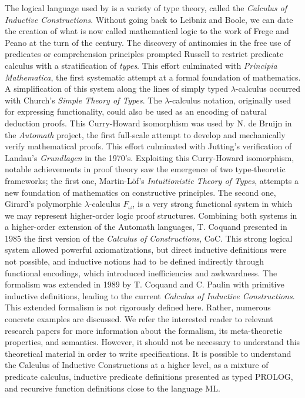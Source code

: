 The logical language used by {\Coq} is a variety of type theory,
called the \emph{Calculus of Inductive Constructions}. Without going
back to Leibniz and Boole, we can date the creation of what is now
called mathematical logic to the work of Frege and Peano at the turn
of the century. The discovery of antinomies in the free use of
predicates or comprehension principles prompted Russell to restrict
predicate calculus with a stratification of \emph{types}. This effort
culminated with \emph{Principia Mathematica}, the first systematic
attempt at a formal foundation of mathematics.  A simplification of
this system along the lines of simply typed $\lambda$-calculus
occurred with Church's \emph{Simple Theory of Types}.  The
$\lambda$-calculus notation, originally used for expressing
functionality, could also be used as an encoding of natural deduction
proofs. This Curry-Howard isomorphism was used by N. de Bruijn in the
\emph{Automath} project, the first full-scale attempt to develop and
mechanically verify mathematical proofs. This effort culminated with
Jutting's verification of Landau's \emph{Grundlagen} in the 1970's.
Exploiting this Curry-Howard isomorphism, notable achievements in
proof theory saw the emergence of two type-theoretic frameworks; the
first one, Martin-L\"of's \emph{Intuitionistic Theory of Types},
attempts a new foundation of mathematics on constructive principles.
The second one, Girard's polymorphic $\lambda$-calculus $F_\omega$, is
a very strong functional system in which we may represent higher-order
logic proof structures.  Combining both systems in a higher-order
extension of the Automath languages, T. Coquand presented in 1985 the
first version of the \emph{Calculus of Constructions}, CoC. This strong
logical system allowed powerful axiomatizations, but direct inductive
definitions were not possible, and inductive notions had to be defined
indirectly through functional encodings, which introduced
inefficiencies and awkwardness. The formalism was extended in 1989 by
T. Coquand and C. Paulin with primitive inductive definitions, leading
to the current \emph{Calculus of Inductive Constructions}.  This
extended formalism is not rigorously defined here. Rather, numerous
concrete examples are discussed. We refer the interested reader to
relevant research papers for more information about the formalism, its
meta-theoretic properties, and semantics. However, it should not be
necessary to understand this theoretical material in order to write
specifications. It is possible to understand the Calculus of Inductive
Constructions at a higher level, as a mixture of predicate calculus,
inductive predicate definitions presented as typed PROLOG, and
recursive function definitions close to the language ML.

